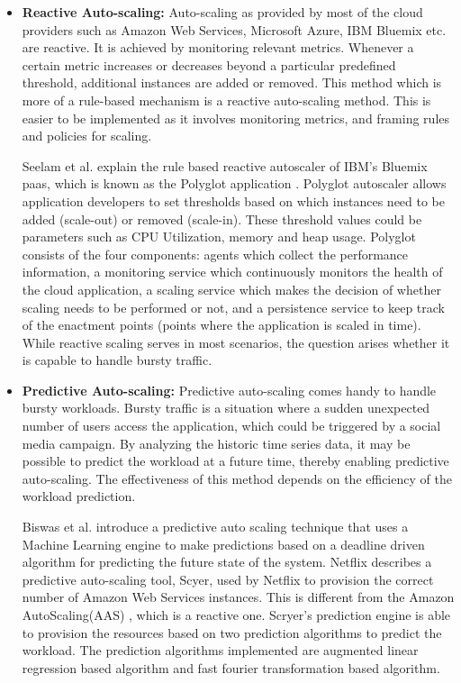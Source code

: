 \documentclass[article,type=msc,colorback,12pt,accentcolor=tud8b,table]{tudthesis}
\begin{document}
	\begin{itemize}
	
	\item{\textbf{Reactive Auto-scaling: }}Auto-scaling as provided by most of the cloud providers such as Amazon Web Services, Microsoft Azure, IBM Bluemix etc. are reactive. It is achieved by monitoring relevant metrics. Whenever a certain metric increases or decreases beyond a particular predefined threshold, additional instances are added or removed. This method which is more of a rule-based mechanism is a reactive auto-scaling method. This is easier to be implemented as it involves monitoring metrics, and framing rules and policies for scaling. 
	
	Seelam et al. explain the rule based reactive autoscaler of IBM's Bluemix \gls{paas}, which is known as the Polyglot application \cite{seelam2015polyglot}. Polyglot autoscaler allows application developers to set thresholds based on which instances need to be added (scale-out) or removed (scale-in). These threshold values could be parameters such as CPU Utilization, memory and heap usage. Polyglot consists of the four components: agents which collect the performance information, a monitoring service which continuously monitors the health of the cloud application, a scaling service which makes the decision of whether scaling needs to be performed or not, and a persistence service to keep track of the enactment points (points where the application is scaled in time). While reactive scaling serves in most scenarios, the question arises whether it is capable to handle bursty traffic.

\item{\textbf{Predictive Auto-scaling: }}Predictive auto-scaling comes handy to handle bursty workloads. Bursty traffic is a situation where a sudden unexpected number of users access the application, which could be triggered by a social media campaign. By analyzing the historic time series data, it may be possible to predict the workload at a future time, thereby enabling predictive auto-scaling. The effectiveness of this method depends on the efficiency of the workload prediction.

Biswas et al. \cite{biswas2015predictive} introduce a predictive auto scaling technique that uses a Machine Learning engine to make predictions based on a deadline driven algorithm for predicting the future state of the system. Netflix\cite{Scryer1, Scryer2} describes a predictive auto-scaling tool, Scyer, used by Netflix to provision the correct number of Amazon Web Services \cite{aws} instances. This is different from the Amazon AutoScaling(AAS) \cite{aas}, which is a reactive one. Scryer's prediction engine is able to provision the resources based on two prediction algorithms to predict the workload. The prediction algorithms implemented are augmented linear regression based algorithm and fast fourier transformation based algorithm.


\end{itemize}
\end{document}
